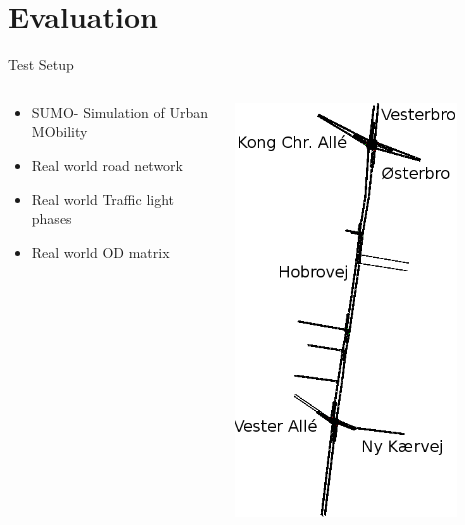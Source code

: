 

\section{Evaluation}
\begin{frame}{Test Setup}



\begin{columns}
	\begin{column}{0.7\textwidth}
		\begin{itemize}
		\item SUMO- Simulation of Urban MObility\\
		\item Real world road network\\
		\item Real world Traffic light phases\\
		\item Real world OD matrix\\
		\end{itemize}
	\end{column}

	\begin{column}{0.3\textwidth}
		\includegraphics[width=0.8\textwidth]{images/Hobrovej.png}
	\end{column}
\end{columns}
\end{frame}


